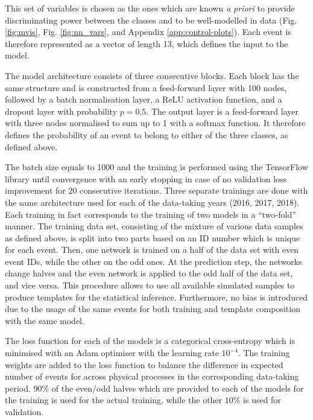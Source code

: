This set of variables is chosen as the ones which are known \textit{a priori} to provide discriminating power between the classes and to be well-modelled in data (Fig. \ref{fig:mvis}, Fig. \ref{fig:nn_vars}, and Appendix \ref{app:control-plots}). Each event is therefore represented as a vector of length 13, which defines the input to the model.

The model architecture consists of three consecutive blocks. Each block has the same structure and is constructed from a feed-forward layer with 100 nodes, followed by a batch normalisation layer, a ReLU activation function, and a dropout layer with probability $p=0.5$. The output layer is a feed-forward layer with three nodes normalised to sum up to 1 with a softmax function. It therefore defines the probability of an event to belong to either of the three classes, as defined above.

The batch size equals to 1000 and the training is performed using the TensorFlow library \cite{tensorflow2015-whitepaper} until convergence with an early stopping in case of no validation loss improvement for 20 consecutive iterations. Three separate trainings are done with the same architecture used for each of the data-taking years (2016, 2017, 2018). Each training in fact corresponds to the training of two models in a \enquote{two-fold} manner. The training data set, consisting of the mixture of various data samples as defined above, is split into two parts based on an ID number which is unique for each event. Then, one network is trained on a half of the data set with even event IDs, while the other on the odd ones. At the prediction step, the networks change halves and the even network is applied to the odd half of the data set, and vice versa. This procedure allows to use all available simulated samples to produce templates for the statistical inference. Furthermore, no bias is introduced due to the usage of the same events for both training and template composition with the same model.  

The loss function for each of the models is a categorical cross-entropy which is minimised with an Adam optimiser \cite{kingma2014adam} with the learning rate $10^{-4}$. The training weights are added to the loss function to balance the difference in expected number of events for across physical processes in the corresponding data-taking period. $90\%$ of the even/odd halves which are provided to each of the models for the training is used for the actual training, while the other $10\%$ is used for validation.

